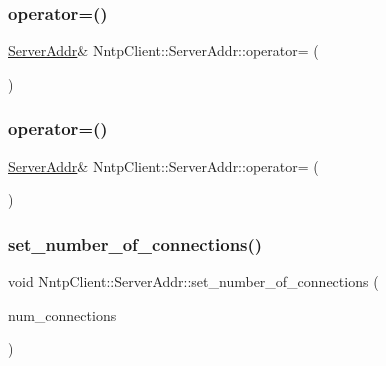 \subsubsection{\texorpdfstring{operator=()}{operator=()}\hspace{0.1cm}{\footnotesize\ttfamily [1/2]}}
{\footnotesize\ttfamily \hyperlink{class_nntp_client_1_1_server_addr}{Server\+Addr}\& Nntp\+Client\+::\+Server\+Addr\+::operator= (\begin{DoxyParamCaption}\item[{const \hyperlink{class_nntp_client_1_1_server_addr}{Server\+Addr} \&}]{ }\end{DoxyParamCaption})\hspace{0.3cm}{\ttfamily [default]}}

\hypertarget{class_nntp_client_1_1_server_addr_aaba670b1aa1ae58c2ed75334903c9cb2}{}\label{class_nntp_client_1_1_server_addr_aaba670b1aa1ae58c2ed75334903c9cb2} 
\subsubsection{\texorpdfstring{operator=()}{operator=()}\hspace{0.1cm}{\footnotesize\ttfamily [2/2]}}
{\footnotesize\ttfamily \hyperlink{class_nntp_client_1_1_server_addr}{Server\+Addr}\& Nntp\+Client\+::\+Server\+Addr\+::operator= (\begin{DoxyParamCaption}\item[{\hyperlink{class_nntp_client_1_1_server_addr}{Server\+Addr} \&\&}]{ }\end{DoxyParamCaption})\hspace{0.3cm}{\ttfamily [default]}}

\hypertarget{class_nntp_client_1_1_server_addr_acdf2a374db8aaa62703037cfd7d60e3a}{}\label{class_nntp_client_1_1_server_addr_acdf2a374db8aaa62703037cfd7d60e3a} 
\subsubsection{\texorpdfstring{set\+\_\+number\+\_\+of\+\_\+connections()}{set\_number\_of\_connections()}}
{\footnotesize\ttfamily void Nntp\+Client\+::\+Server\+Addr\+::set\+\_\+number\+\_\+of\+\_\+connections (\begin{DoxyParamCaption}\item[{int}]{num\+\_\+connections }\end{DoxyParamCaption})\hspace{0.3cm}{\ttfamily [inline]}}

